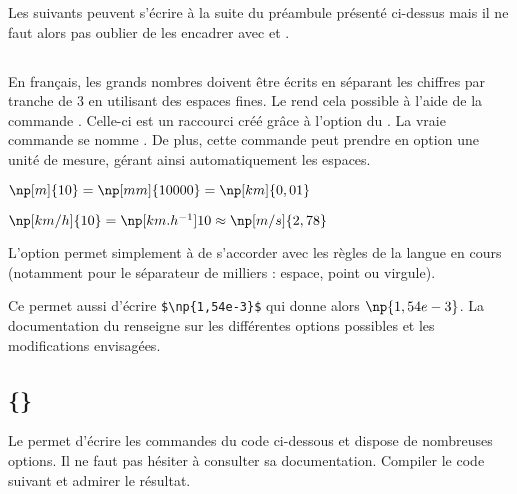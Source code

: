 \documentclass[10pt,french,openright,twoside]{book}
\begin{document}
\begin{info}
    Les  suivants peuvent s'écrire à la suite du préambule présenté ci-dessus mais il ne faut alors pas oublier de les encadrer avec  et .
\end{info}

\subsection{}

En français, les grands nombres doivent être écrits en séparant les chiffres par tranche de $3$ en utilisant des espaces fines. Le \package {} rend cela possible à l'aide de la commande . Celle-ci est un raccourci créé grâce à l'option  du \package. La vraie commande se nomme . De plus, cette commande peut prendre en option une unité de mesure, gérant ainsi automatiquement les espaces.\bigskip

{\NewFont
\begin{SideBySideExample}
    $\np[m]{10} = \np[mm]{10000} = \np[km]{0,01}$\par
    $\np[km/h]{10} = \np[km.h^{-1}]{10}
    \approx \np[m/s]{2,78}$
\end{SideBySideExample}
}\bigskip

\begin{info}
    L'option  permet simplement à  de s'accorder avec les règles de la langue en cours (notamment pour le séparateur de milliers : espace, point ou virgule).
\end{info}

Ce \package permet aussi d'écrire \verb!$\np{1,54e-3}$! qui donne alors $\np{1,54e-3}$. La documentation du \package renseigne sur les différentes options possibles et les modifications envisagées.

\subsection{\{\}}

Le \package {} permet d'écrire les commandes du code ci-dessous et dispose de nombreuses options. Il ne faut pas hésiter à consulter sa documentation. Compiler le code suivant et admirer le résultat.

\end{document}
